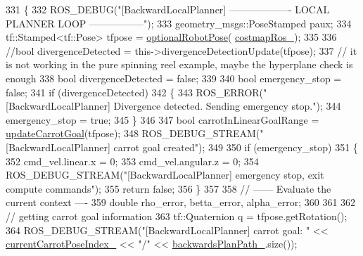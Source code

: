 \begin{DoxyCode}
331         \{
332             ROS\_DEBUG(\textcolor{stringliteral}{"[BackwardLocalPlanner] ------------------- LOCAL PLANNER LOOP -----------------"});
333             geometry\_msgs::PoseStamped paux;
334             tf::Stamped<tf::Pose> tfpose = \hyperlink{namespacecl__move__base__z_1_1backward__local__planner_afd5bb2a0d144f7b89f4215fbcb1fbe69}{optionalRobotPose}(
      \hyperlink{classcl__move__base__z_1_1backward__local__planner_1_1BackwardLocalPlanner_a4136268882a105d9e06e173d85d5c0dc}{costmapRos\_});
335 
336             \textcolor{comment}{//bool divergenceDetected = this->divergenceDetectionUpdate(tfpose);}
337             \textcolor{comment}{// it is not working in the pure spinning reel example, maybe the hyperplane check is enough}
338             \textcolor{keywordtype}{bool} divergenceDetected = \textcolor{keyword}{false};
339 
340             \textcolor{keywordtype}{bool} emergency\_stop = \textcolor{keyword}{false};
341             \textcolor{keywordflow}{if} (divergenceDetected)
342             \{
343                 ROS\_ERROR(\textcolor{stringliteral}{"[BackwardLocalPlanner] Divergence detected. Sending emergency stop."});
344                 emergency\_stop = \textcolor{keyword}{true};
345             \}
346 
347             \textcolor{keywordtype}{bool} carrotInLinearGoalRange = \hyperlink{classcl__move__base__z_1_1backward__local__planner_1_1BackwardLocalPlanner_a16e79a1b4c0f18879f6f0a8ba67103fd}{updateCarrotGoal}(tfpose);
348             ROS\_DEBUG\_STREAM(\textcolor{stringliteral}{"[BackwardLocalPlanner] carrot goal created"});
349 
350             \textcolor{keywordflow}{if} (emergency\_stop)
351             \{
352                 cmd\_vel.linear.x = 0;
353                 cmd\_vel.angular.z = 0;
354                 ROS\_DEBUG\_STREAM(\textcolor{stringliteral}{"[BackwardLocalPlanner] emergency stop, exit compute commands"});
355                 \textcolor{keywordflow}{return} \textcolor{keyword}{false};
356             \}
357 
358             \textcolor{comment}{// ------ Evaluate the current context ----}
359             \textcolor{keywordtype}{double} rho\_error, betta\_error, alpha\_error;
360             
361 
362                 \textcolor{comment}{// getting carrot goal information}
363                 tf::Quaternion q = tfpose.getRotation();
364                 ROS\_DEBUG\_STREAM(\textcolor{stringliteral}{"[BackwardLocalPlanner] carrot goal: "} << 
      \hyperlink{classcl__move__base__z_1_1backward__local__planner_1_1BackwardLocalPlanner_a2e8f2b78bc97f27c5fa431f3af2261ed}{currentCarrotPoseIndex\_} << \textcolor{stringliteral}{"/"} << \hyperlink{classcl__move__base__z_1_1backward__local__planner_1_1BackwardLocalPlanner_ad9cde5c85f782cab2ddb4030e3c3f2cf}{backwardsPlanPath\_}.size());

\end{DoxyCode}
